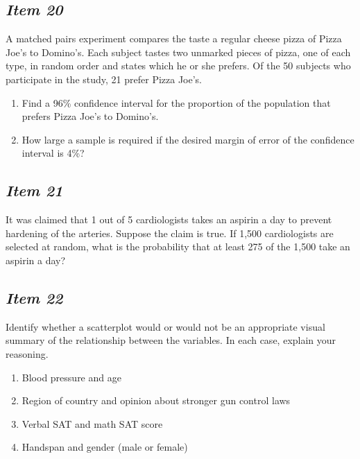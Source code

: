 \documentclass[twoside,openany]{tufte-book}
\begin{document}
\subsection{\textbf{\textit{Item 20}}}
A matched pairs experiment compares the taste a regular cheese pizza of Pizza Joe's to Domino's.  Each subject tastes two unmarked pieces of pizza, one of each type, in random order and states which he or she prefers.  Of the 50 subjects who participate in the study, 21 prefer Pizza Joe's.   
\begin{enumerate}[leftmargin=1cm, itemsep=.2em]
\item Find a 96\% confidence interval for the proportion of the population that prefers Pizza Joe's to Domino's.
\item How large a sample is required if the desired margin of error of the confidence interval is 4\%?
\end{enumerate}

\subsection{\textbf{\textit{Item 21}}}
It was claimed that 1 out of 5 cardiologists takes an aspirin a day to prevent hardening of the arteries.  Suppose the claim is true.  If 1,500 cardiologists are selected at random, what is the probability that at least 275 of the 1,500 take an aspirin a day? 

\subsection{\textbf{\textit{Item 22}}}
Identify whether a scatterplot would or would not be an appropriate visual summary of the relationship between the variables.  In each case, explain your reasoning.  
\begin{enumerate}[leftmargin=1cm, itemsep=.2em]
\item Blood pressure and age
\item Region of country and opinion about stronger gun control laws
\item Verbal SAT and math SAT score
\item Handspan and gender (male or female)
\end{enumerate}
\end{document}
